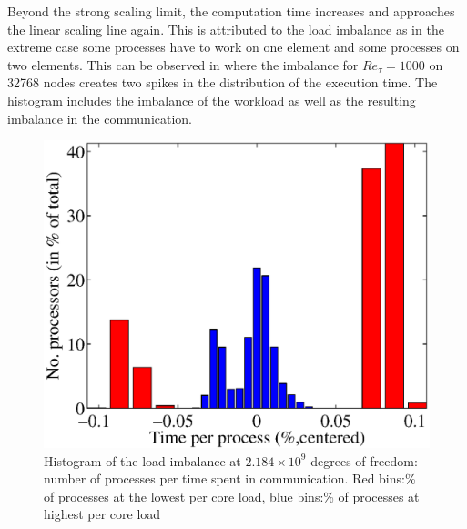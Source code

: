 \documentclass{sig-alternate}
\begin{document}
Beyond the strong scaling limit, the computation time increases and
approaches the linear scaling line again. This is attributed to the load
imbalance as in the extreme case some processes have to work on one element and
some processes on two elements. This can be observed in
where the imbalance for $Re_{\tau}=1000$ on 32768 nodes creates two spikes in the
distribution of the execution time. The histogram includes the imbalance of
the workload as well as the resulting imbalance in the communication.
\begin{figure}
  \centering
  \includegraphics[width=\linewidth]{./figures/loadbalance.eps}
  \caption{Histogram of the load imbalance at $2.184\times10^9$ degrees of freedom: number of processes per time spent in communication. Red bins:\% of processes at the lowest per core load, blue bins:\% of processes at highest per core load}
  \label{fig:imbalancehist}
\end{figure}
\end{document}
